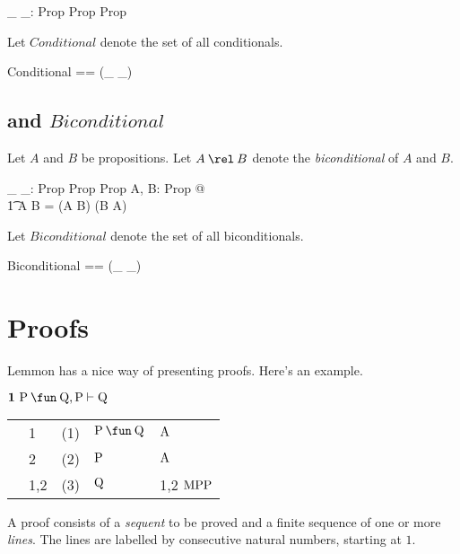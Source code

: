 \documentclass[11pt, oneside]{article}
\begin{document}
\begin{axdef}
	\_ \impliesProp \_: Prop \cross Prop \inj Prop
\end{axdef}

Let $Conditional$ denote the set of all conditionals.

\begin{zed}
	Conditional == \ran (\_ \impliesProp \_)
\end{zed}

\subsection{ and $Biconditional$}

Let $A$ and $B$ be propositions.
Let $A \equivProp B$ denote the {\it biconditional} of $A$ and $B$.

\begin{axdef}
	\_ \equivProp \_: Prop \cross Prop \inj Prop
\where
	\forall A, B: Prop @ \\
	\t1	A \equivProp B = (A \impliesProp B) \andProp (B \impliesProp A)
\end{axdef}

Let $Biconditional$ denote the set of all biconditionals.

\begin{zed}
	Biconditional == \ran (\_ \equivProp \_)
\end{zed}

\section{Proofs}

Lemmon has a nice way of presenting proofs.
Here's an example.

\vspace{1ex}

$\mathbf{1}\ \propP \impliesProp \propQ, \propP \vdash \propQ$

\vspace{1ex}

\begin{tabular}{l l r l l}
&	1	&	(1)	&	$\propP \impliesProp \propQ$	&	$\operatorname{A}$ \\
&	2	&	(2)	&	$\mathrm{P}$					&	$\operatorname{A}$ \\
&	1,2	&	(3)	&	$\mathrm{Q}$					&	1,2 $\operatorname{MPP}$
\end{tabular}

\vspace{1ex}

A proof consists of a {\it sequent} to be proved and a finite sequence of one or more {\it lines}.
The lines are labelled by consecutive natural numbers, starting at $1$.
\end{document}
